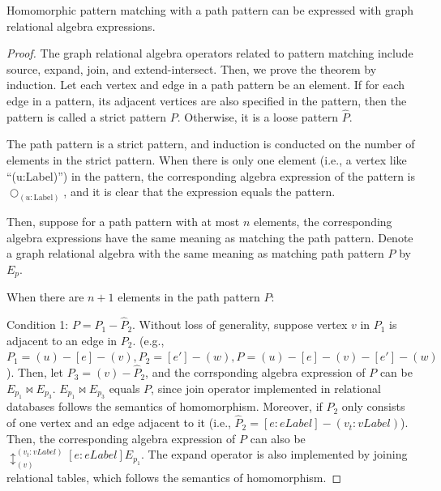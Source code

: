 \begin{theorem}
    Homomorphic pattern matching with a path pattern can be expressed with graph relational algebra expressions.
\end{theorem}
\begin{proof}
    The graph relational algebra operators related to pattern matching include source, expand, join, and extend-intersect.
    Then, we prove the theorem by induction.
    Let each vertex and edge in a path pattern be an element.
    If for each edge in a pattern, its adjacent vertices are also specified in the pattern, then the pattern is called a strict pattern $P$.
    Otherwise, it is a loose pattern $\hat{P}$.

    The path pattern is a strict pattern, and induction is conducted on the number of elements in the strict pattern.
    When there is only one element (i.e., a vertex like ``(u:Label)'') in the pattern, the corresponding algebra expression of the pattern is $\bigcirc_{(u:\text{Label})}$, and it is clear that the expression equals the pattern.

    Then, suppose for a path pattern with at most $n$ elements, the corresponding algebra expressions have the same meaning as matching the path pattern.
    Denote a graph relational algebra with the same meaning as matching path pattern $P$ by $E_p$.

    When there are $n + 1$ elements in the path pattern $P$:



    Condition 1: $P = P_1 - \hat{P}_2$.
    Without loss of generality, suppose vertex $v$ in $P_1$ is adjacent to an edge in $P_2$.
    (e.g., $P_1 = (u)-[e]-(v), P_2 = [e']-(w), P = (u)-[e]-(v)-[e']-(w)$).
    Then, let $P_3 = (v)-\hat{P}_2$, and the corrsponding algebra expression of $P$ can be $E_{p_1} \Join E_{p_3}$.
    $E_{p_1} \Join E_{p_3}$ equals $P$, since join operator implemented in relational databases follows the semantics of homomorphism.
    Moreover, if $\hat{P}_2$ only consists of one vertex and an edge adjacent to it (i.e., $\hat{P}_2 = [e:eLabel]-(v_t:vLabel)$).
    Then, the corresponding algebra expression of $P$ can also be $\updownarrow_{(v)}^{(v_t:vLabel)}[e:eLabel]E_{p_1}$.
    The expand operator is also implemented by joining relational tables, which follows the semantics of homomorphism.


\end{proof}
